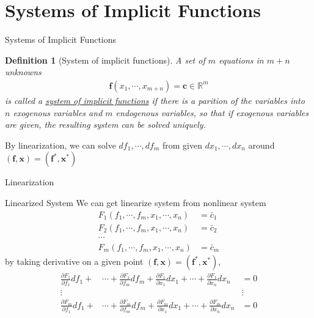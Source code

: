 \documentclass[a4paper,11pt]{article}
\newtheorem{defn}{Definition}
\newcommand{\bb}{\mathbb}
\newcommand{\bd}{\mathbf}
\newcommand{\p}{\partial}
\begin{document}
\section{Systems of Implicit Functions} %
\label{sec:systems_of_implicit_functions}
\begin{frame}[t]{Systems of Implicit Functions}
	\begin{defn}
		[System of implicit functions] A set of $m$ equations in $m+n$ unknowns
		\begin{align*}
			\bd{f}(x_1,\cdots,x_{m+n}) = \bd c \in \bb{R}^m
		\end{align*}
		is called a \uline{system of implicit functions} if there is a parition of the variables into $n$ exogenous variables and $m$ endogenous variables, so that if exogenous variables are given, the resulting system can be solved uniquely.
	\end{defn}
		By linearization, we can solve $df_1,\cdots,df_m$ from given $dx_1,\cdots,dx_n$ around $(\bd{f},\bd{x})=(\bd{f}^\ast,\bd{x}^\ast)$
\end{frame}
\begin{frame}[t]{Linearization}
	\begin{block}
		{Linearized System}
		We can get linearize system from nonlinear system
		\begin{align*}
			F_1(f_1,\cdots,f_m, x_1,\cdots,x_n) &= \bar c_1\\
			F_2(f_1,\cdots,f_m, x_1,\cdots,x_n) &= \bar c_2\\
			\cdots\\
			F_m(f_1,\cdots,f_m, x_1,\cdots,x_n) &= \bar c_m
		\end{align*}
		by taking derivative on a given point $(\bd{f},\bd{x})=(\bd{f}^\ast,\bd{x}^\ast)$,
		\begin{align*}
			\frac{\p F_1}{\p f_1}df_1 + 
			&\cdots + \frac{\p F_1}{\p f_m}df_m + \frac{\p F_1}{\p x_1}dx_1 + 
			\cdots + \frac{\p F_1}{\p x_n}dx_n 
			&= 0 \\
			\vdots&
			&\vdots
			\\
			\frac{\p F_m}{\p f_1}df_1 + 
			&\cdots + \frac{\p F_m}{\p f_m}df_m + \frac{\p F_m}{\p x_1}dx_1 + \cdots + \frac{\p F_m}{\p x_n}dx_n 
			&= 0 \\
		\end{align*}
	\end{block}
\end{frame}
\end{document}
